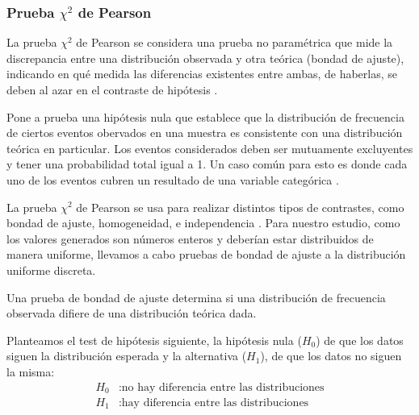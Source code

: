 \subsubsection{Prueba \texorpdfstring{$\chi^2$}{X2} de Pearson}
La prueba $\chi^2$ de Pearson se considera una prueba no paramétrica que mide la discrepancia entre una distribución observada y otra teórica (bondad de ajuste), indicando en qué medida las diferencias existentes entre ambas, de haberlas, se deben al azar en el contraste de hipótesis \cite{eswiki2022pearson}.

Pone a prueba una hipótesis nula que establece que la distribución de frecuencia de ciertos eventos obervados en una muestra es consistente con una distribución teórica en particular. Los eventos considerados deben ser mutuamente excluyentes y tener una probabilidad total igual a 1. Un caso común para esto es donde cada uno de los eventos cubren un resultado de una variable categórica \cite{enwiki2022pearson}.

La prueba $\chi^{2}$ de Pearson se usa para realizar distintos tipos de contrastes, como bondad de ajuste, homogeneidad, e independencia \cite{enwiki2022pearson}. Para nuestro estudio, como los valores generados son números enteros y deberían estar distribuidos de manera uniforme, llevamos a cabo pruebas de bondad de ajuste a la distribución uniforme discreta.

Una prueba de bondad de ajuste determina si una distribución de frecuencia observada difiere de una distribución teórica dada.

Planteamos el test de hipótesis siguiente, la hipótesis nula ($H_{0}$) de que los datos siguen la distribución esperada y la alternativa ($H_{1}$), de que los datos no siguen la misma:
\begin{align*}
H_{0}&: \text{no hay diferencia entre las distribuciones}\\
H_{1}&: \text{hay diferencia entre las distribuciones}
\end{align*}

